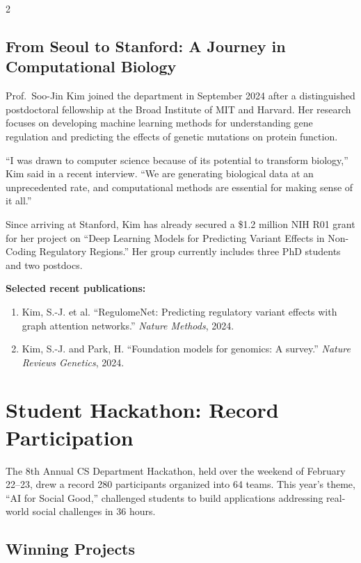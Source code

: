 \documentclass[10pt,a4paper]{article}
\begin{document}
\begin{multicols}{2}
\subsection{From Seoul to Stanford: A Journey in Computational Biology}

Prof.\ Soo-Jin Kim joined the department in September 2024 after a distinguished postdoctoral fellowship at the Broad Institute of MIT and Harvard. Her research focuses on developing machine learning methods for understanding gene regulation and predicting the effects of genetic mutations on protein function.

``I was drawn to computer science because of its potential to transform biology,'' Kim said in a recent interview. ``We are generating biological data at an unprecedented rate, and computational methods are essential for making sense of it all.''

Since arriving at Stanford, Kim has already secured a \$1.2 million NIH R01 grant for her project on ``Deep Learning Models for Predicting Variant Effects in Non-Coding Regulatory Regions.'' Her group currently includes three PhD students and two postdocs.

\textbf{Selected recent publications:}
\begin{enumerate}[leftmargin=1.5em, nosep, itemsep=2pt]
  \item Kim, S.-J. et al. ``RegulomeNet: Predicting regulatory variant effects with graph attention networks.'' \textit{Nature Methods}, 2024.
  \item Kim, S.-J. and Park, H. ``Foundation models for genomics: A survey.'' \textit{Nature Reviews Genetics}, 2024.
\end{enumerate}

\section{Student Hackathon: Record Participation}

The 8th Annual CS Department Hackathon, held over the weekend of February 22--23, drew a record 280 participants organized into 64 teams. This year's theme, ``AI for Social Good,'' challenged students to build applications addressing real-world social challenges in 36 hours.

\subsection{Winning Projects}


\end{multicols}
\end{document}
